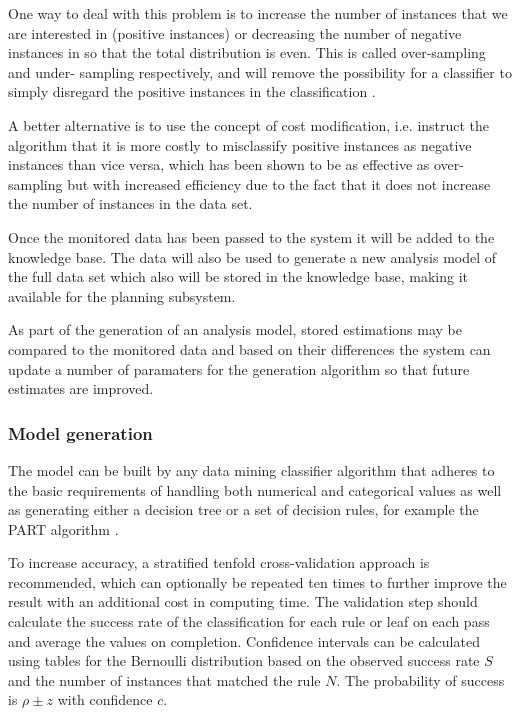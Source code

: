 \documentclass[a4paper]{article}
\begin{document}
One way to deal with this problem is to increase the number of instances that we are interested in (positive instances) or
decreasing the number of negative instances in so that the total distribution is even. This is called over-sampling and under-
sampling respectively, and will remove the possibility for a classifier to simply disregard the positive instances in the
classification \citep{Chawla2004, Japkowicz2002}.

A better alternative is to use the concept of cost modification, i.e. instruct the algorithm that it is more costly to misclassify
positive instances as negative instances than vice versa, which has been shown to be as effective as over-sampling but with
increased efficiency \citep{Chawla2004, Japkowicz2002} due to the fact that it does not increase the number of instances in the
data set.

Once the monitored data has been passed to the system it will be added to the knowledge base. The data will also be used to 
generate a new analysis model of the full data set which also will be stored in the knowledge base, making it available for the
planning subsystem.

As part of the generation of an analysis model, stored estimations may be compared to the monitored data and based on their
differences the system can update a number of paramaters for the generation algorithm so that future estimates are improved.

\subsubsection{Model generation}
The model can be built by any data mining classifier algorithm that adheres to the basic requirements of handling both numerical 
and categorical values as well as generating either a decision tree or a set of decision rules, for example the PART algorithm 
\citep{Frank1998}.

To increase accuracy, a stratified tenfold cross-validation approach is recommended, which can optionally be repeated ten times to
further improve the result with an additional cost in computing time. The validation step should calculate the success rate
of the classification for each rule or leaf on each pass and average the values on completion. Confidence intervals can be
calculated using tables for the Bernoulli distribution \citep[chap. 5]{Witten2011} based on the observed success rate \(S\) and the 
number of instances that matched the rule \(N\). The probability of success is \(\rho \pm z\) with confidence \(c\).
\end{document}
